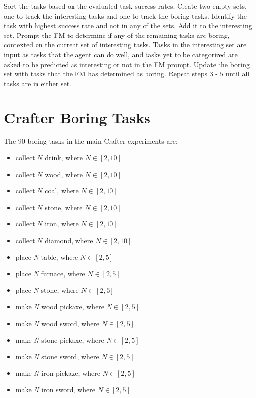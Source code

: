 \documentclass{article} %
\begin{document}
\begin{algorithm}[H]
\begin{algorithmic}[1]\onehalfspacing
\State Sort the tasks based on the evaluated task success rates.
\State Create two empty sets, one to track the interesting tasks and one to track the boring tasks.
\State Identify the task with highest success rate and not in any of the sets. Add it to the interesting set.\label{algostep:3}
\State Prompt the FM to determine if any of the remaining tasks are boring, contexted on the current set of interesting tasks. Tasks in the interesting set are input as tasks that the agent can do well, and tasks yet to be categorized are asked to be predicted as interesting or not in the FM prompt. \label{algostep:4}
\State Update the boring set with tasks that the FM has determined as boring. \label{algostep:5}
\State Repeat steps 3 - 5 until all tasks are in either set.
\end{algorithmic}
\caption{Mechanism to partition the task set into interesting and boring sets.}
\label{algo:int}
\end{algorithm}

\section{Crafter Boring Tasks}
\label{app:boring-tasks}
The 90 boring tasks in the main Crafter experiments are:
\begin{itemize}
    \item collect $N$ drink, where $N \in [2, 10]$
    \item collect $N$ wood, where $N \in [2, 10]$
    \item collect $N$ coal, where $N \in [2, 10]$
    \item collect $N$ stone, where $N \in [2, 10]$
    \item collect $N$ iron, where $N \in [2, 10]$
    \item collect $N$ diamond, where $N \in [2, 10]$
    \item place $N$ table, where $N \in [2, 5]$
    \item place $N$ furnace, where $N \in [2, 5]$
    \item place $N$ stone, where $N \in [2, 5]$
    \item make $N$ wood pickaxe, where $N \in [2, 5]$
    \item make $N$ wood sword, where $N \in [2, 5]$
    \item make $N$ stone pickaxe, where $N \in [2, 5]$
    \item make $N$ stone sword, where $N \in [2, 5]$
    \item make $N$ iron pickaxe, where $N \in [2, 5]$
    \item make $N$ iron sword, where $N \in [2, 5]$
\end{itemize}
\end{document}
